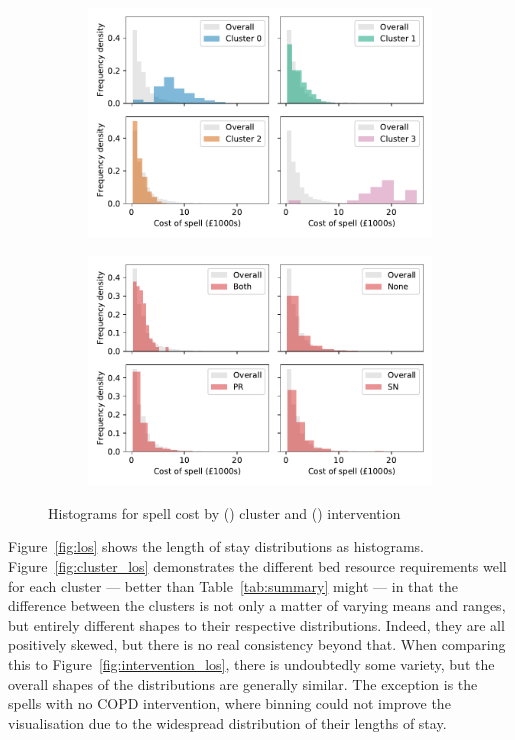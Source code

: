 \begin{figure}
    \centering
    \begin{subfigure}{\imgwidth}
        \includegraphics[width=\linewidth]{cluster_spell_cost}
        \caption{}\label{fig:cluster_cost}
    \end{subfigure}

    \begin{subfigure}{\imgwidth}
        \includegraphics[width=\linewidth]{intervention_spell_cost}
        \caption{}\label{fig:intervention_cost}
    \end{subfigure}
    \caption{%
        Histograms for spell cost by () cluster and
        () intervention
    }\label{fig:cost}
\end{figure}

Figure~\ref{fig:los} shows the length of stay distributions as histograms.
Figure~\ref{fig:cluster_los} demonstrates the different bed resource
requirements well for each cluster --- better than Table~\ref{tab:summary} might
--- in that the difference between the clusters is not only a matter of varying
means and ranges, but entirely different shapes to their respective
distributions. Indeed, they are all positively skewed, but there is no real
consistency beyond that. When comparing this to
Figure~\ref{fig:intervention_los}, there is undoubtedly some variety, but the
overall shapes of the distributions are generally similar. The exception is the
spells with no COPD intervention, where binning could not improve the
visualisation due to the widespread distribution of their lengths of stay.

